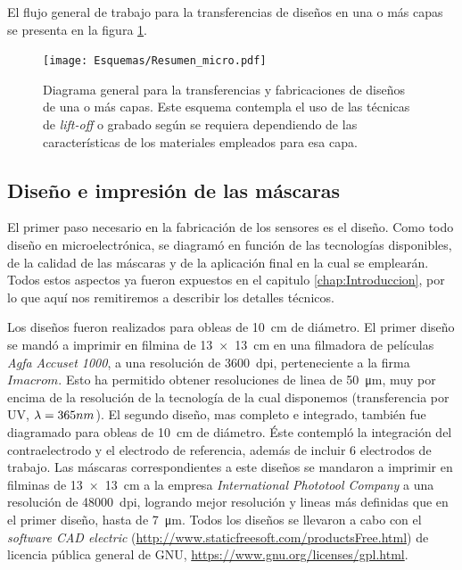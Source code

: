 	 El flujo general de trabajo para la transferencias de diseños en una o más capas se presenta en la figura \ref{esq:micro}.
			
			 \begin{figure}[h!]
			  \begin{center}
			  \texttt{[image: Esquemas/Resumen\_micro.pdf]}
			  \caption[Esquema para la transferencia de los diseños]{Diagrama general para la transferencias y fabricaciones de diseños de una o más capas. Este esquema contempla el uso de las técnicas de \textit{lift-off }o grabado según se requiera dependiendo de las características de los materiales empleados para esa capa.}
			  \label{esq:micro}
			  \end{center}
			  \end{figure}

	\subsection{Diseño e impresión de las máscaras}\label{sec:impresion_mascaras}

		El primer paso necesario en la fabricación de los sensores es el diseño. Como todo diseño en microelectrónica, se diagramó en función de las tecnologías disponibles, de la calidad de las máscaras y de la aplicación final en la cual se emplearán. Todos estos aspectos ya fueron expuestos en el capitulo \ref{chap:Introduccion}, por lo que aquí nos remitiremos a describir los detalles técnicos.

		Los diseños fueron realizados para obleas de \SI{10}{\cm} de diámetro. El primer diseño se mandó a imprimir en filmina de \SI{13x13}{\cm} en una filmadora de películas \textit{Agfa Accuset 1000}, a una resolución de \SI{3600}{dpi}, perteneciente a la firma $Imacrom$. Esto ha permitido obtener resoluciones de linea de \SI{50}{\um}, muy por encima de la resolución de la tecnología de la cual disponemos (transferencia por UV, $\lambda\index{longitud de onda}=365nm$). El segundo diseño, mas completo e integrado, también fue diagramado para obleas de \SI{10}{\cm} de diámetro. Éste contempló la integración del contraelectrodo y el electrodo de referencia, además de incluir 6 electrodos de trabajo. Las máscaras correspondientes a este diseños se mandaron a imprimir en filminas de \SI{13x13}{\cm} a la empresa \textit{International Phototool Company} a una resolución de \SI{48000}{dpi}, logrando mejor resolución y lineas más definidas que en el primer diseño, hasta de \SI{7}{\um}. Todos los diseños se llevaron a cabo con el \textit{software CAD electric} (\url{http://www.staticfreesoft.com/productsFree.html}) de licencia pública general de GNU, \url{https://www.gnu.org/licenses/gpl.html}. 
				
